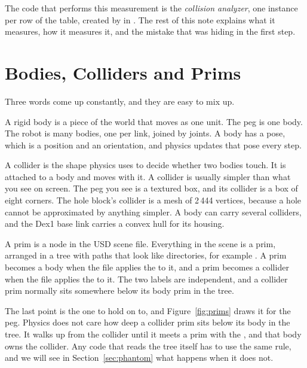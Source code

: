 The code that performs this measurement is the \emph{collision analyzer}, one instance per row of the table, created by  in . The rest of this note explains what it measures, how it measures it, and the mistake that was hiding in the first step.

\section{Bodies, Colliders and Prims}
\label{sec:prims}

Three words come up constantly, and they are easy to mix up.

\begin{description}[leftmargin=1.6em, style=nextline]
\item[Body] A rigid body is a piece of the world that moves as one unit. The peg is one body. The robot is many bodies, one per link, joined by joints. A body has a pose, which is a position and an orientation, and physics updates that pose every step.
\item[Collider] A collider is the shape physics uses to decide whether two bodies touch. It is attached to a body and moves with it. A collider is usually simpler than what you see on screen. The peg you see is a textured box, and its collider is a box of eight corners. The hole block's collider is a mesh of 2\,444 vertices, because a hole cannot be approximated by anything simpler. A body can carry several colliders, and the Dex1 base link carries a convex hull for its housing.
\item[Prim] A prim is a node in the USD scene file. Everything in the scene is a prim, arranged in a tree with paths that look like directories, for example . A prim becomes a body when the file applies the  to it, and a prim becomes a collider when the file applies the  to it. The two labels are independent, and a collider prim normally sits somewhere below its body prim in the tree.
\end{description}

The last point is the one to hold on to, and Figure~\ref{fig:prims} draws it for the peg. Physics does not care how deep a collider prim sits below its body in the tree. It walks up from the collider until it meets a prim with the , and that body owns the collider. Any code that reads the tree itself has to use the same rule, and we will see in Section~\ref{sec:phantom} what happens when it does not.

